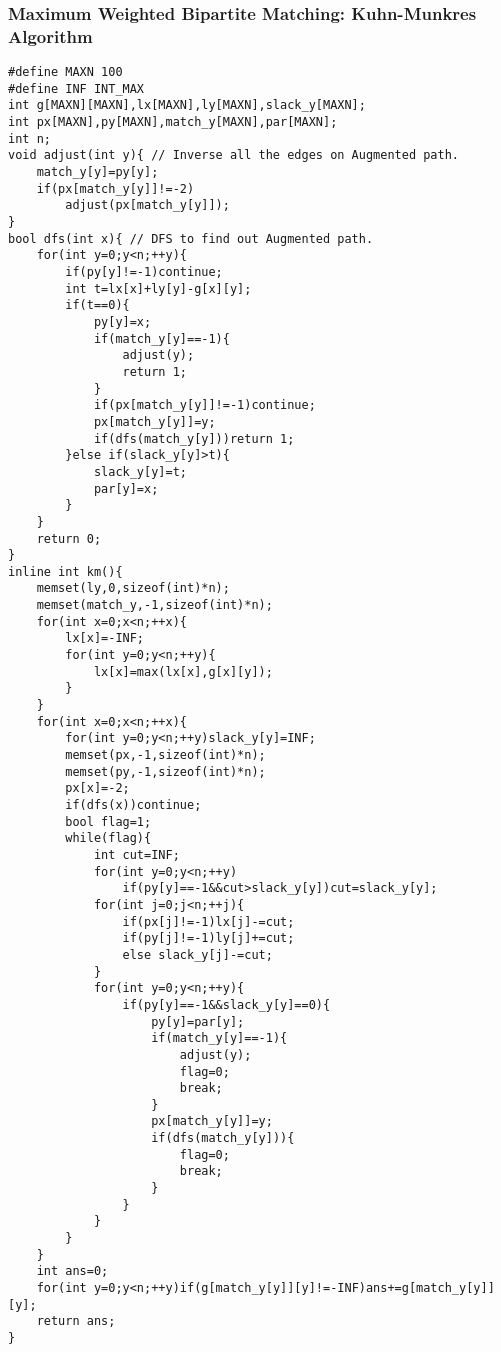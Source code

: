 \documentclass[10pt,twocolumn,oneside]{article}
\begin{document}
\subsubsection{Maximum Weighted Bipartite Matching: Kuhn-Munkres Algorithm}
\begin{verbatim}
#define MAXN 100
#define INF INT_MAX
int g[MAXN][MAXN],lx[MAXN],ly[MAXN],slack_y[MAXN];
int px[MAXN],py[MAXN],match_y[MAXN],par[MAXN];
int n;
void adjust(int y){ // Inverse all the edges on Augmented path. 
    match_y[y]=py[y];
    if(px[match_y[y]]!=-2)
        adjust(px[match_y[y]]);
}
bool dfs(int x){ // DFS to find out Augmented path.
    for(int y=0;y<n;++y){
        if(py[y]!=-1)continue;
        int t=lx[x]+ly[y]-g[x][y];
        if(t==0){
            py[y]=x;
            if(match_y[y]==-1){
                adjust(y);
                return 1;
            }
            if(px[match_y[y]]!=-1)continue;
            px[match_y[y]]=y;
            if(dfs(match_y[y]))return 1;
        }else if(slack_y[y]>t){ 
            slack_y[y]=t;
            par[y]=x;
        }
    }
    return 0;
}
inline int km(){
    memset(ly,0,sizeof(int)*n);
    memset(match_y,-1,sizeof(int)*n);
    for(int x=0;x<n;++x){
        lx[x]=-INF;
        for(int y=0;y<n;++y){
            lx[x]=max(lx[x],g[x][y]);
        }
    }
    for(int x=0;x<n;++x){
        for(int y=0;y<n;++y)slack_y[y]=INF;
        memset(px,-1,sizeof(int)*n);
        memset(py,-1,sizeof(int)*n);
        px[x]=-2;
        if(dfs(x))continue;
        bool flag=1;
        while(flag){
            int cut=INF;
            for(int y=0;y<n;++y)
                if(py[y]==-1&&cut>slack_y[y])cut=slack_y[y];
            for(int j=0;j<n;++j){
                if(px[j]!=-1)lx[j]-=cut;
                if(py[j]!=-1)ly[j]+=cut;
                else slack_y[j]-=cut;
            }
            for(int y=0;y<n;++y){
                if(py[y]==-1&&slack_y[y]==0){
                    py[y]=par[y];
                    if(match_y[y]==-1){
                        adjust(y);
                        flag=0;
                        break;
                    }
                    px[match_y[y]]=y;
                    if(dfs(match_y[y])){
                        flag=0;
                        break;
                    }
                }
            }
        }
    }
    int ans=0;
    for(int y=0;y<n;++y)if(g[match_y[y]][y]!=-INF)ans+=g[match_y[y]][y];
    return ans;
}
\end{verbatim}
\end{document}
